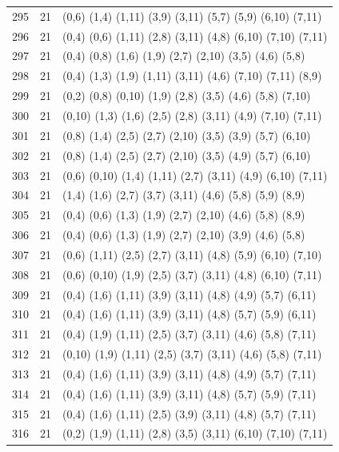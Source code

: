 \begin{appendix}
{\begin{longtable}{lll}
295& 21 & (0,6)   (1,4)  (1,11) (3,9)   (3,11)  (5,7)   (5,9)   (6,10)  (7,11)\\
296& 21 & (0,4)   (0,6)  (1,11) (2,8)   (3,11)  (4,8)   (6,10)  (7,10)  (7,11)\\
297& 21 & (0,4)   (0,8)  (1,6)  (1,9)   (2,7)   (2,10)  (3,5)   (4,6)   (5,8)\\
298& 21 & (0,4)   (1,3)  (1,9)  (1,11)  (3,11)  (4,6)   (7,10)  (7,11)  (8,9)\\
299& 21 & (0,2)   (0,8)  (0,10) (1,9)   (2,8)   (3,5)   (4,6)   (5,8)   (7,10)\\
300& 21 & (0,10)  (1,3)  (1,6)  (2,5)   (2,8)   (3,11)  (4,9)   (7,10)  (7,11)\\
301& 21 & (0,8)   (1,4)  (2,5)  (2,7)   (2,10)  (3,5)   (3,9)   (5,7)   (6,10)\\
302& 21 & (0,8)   (1,4)  (2,5)  (2,7)   (2,10)  (3,5)   (4,9)   (5,7)   (6,10)\\
303& 21 & (0,6)   (0,10) (1,4)  (1,11)  (2,7)   (3,11)  (4,9)   (6,10)  (7,11)\\
304& 21 & (1,4)   (1,6)  (2,7)  (3,7)   (3,11)  (4,6)   (5,8)   (5,9)   (8,9)\\
305& 21 & (0,4)   (0,6)  (1,3)  (1,9)   (2,7)   (2,10)  (4,6)   (5,8)   (8,9)\\
306& 21 & (0,4)   (0,6)  (1,3)  (1,9)   (2,7)   (2,10)  (3,9)   (4,6)   (5,8)\\
307& 21 & (0,6)   (1,11) (2,5)  (2,7)   (3,11)  (4,8)   (5,9)   (6,10)  (7,10)\\
308& 21 & (0,6)   (0,10) (1,9)  (2,5)   (3,7)   (3,11)  (4,8)   (6,10)  (7,11)\\
309& 21 & (0,4)   (1,6)  (1,11) (3,9)   (3,11)  (4,8)   (4,9)   (5,7)   (6,11)\\
310& 21 & (0,4)   (1,6)  (1,11) (3,9)   (3,11)  (4,8)   (5,7)   (5,9)   (6,11)\\
311& 21 & (0,4)   (1,9)  (1,11) (2,5)   (3,7)   (3,11)  (4,6)   (5,8)   (7,11)\\
312& 21 & (0,10)  (1,9)  (1,11) (2,5)   (3,7)   (3,11)  (4,6)   (5,8)   (7,11)\\
313& 21 & (0,4)   (1,6)  (1,11) (3,9)   (3,11)  (4,8)   (4,9)   (5,7)   (7,11)\\
314& 21 & (0,4)   (1,6)  (1,11) (3,9)   (3,11)  (4,8)   (5,7)   (5,9)   (7,11)\\
315& 21 & (0,4)   (1,6)  (1,11) (2,5)   (3,9)   (3,11)  (4,8)   (5,7)   (7,11)\\
316& 21 & (0,2)   (1,9)  (1,11) (2,8)   (3,5)   (3,11)  (6,10)  (7,10)  (7,11)\\

\end{longtable}}
\end{appendix}

